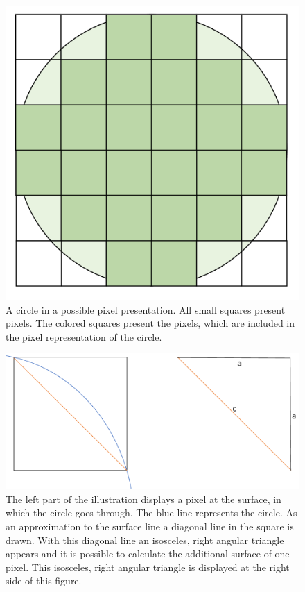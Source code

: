 \begin{figure}[ht]
	\center
	\includegraphics[scale=0.15]{figures/PixelCircleSquare.png}
	\caption[A circle in a possible pixel presentation]{A circle in a possible pixel presentation. All small squares present pixels. The colored squares present the pixels, which are included in the pixel representation of the circle.}
	\label{img:CircleSquarePixels}
\end{figure}

\begin{figure}[ht]
\center
	\includegraphics[scale=0.3]{figures/SurfaceApproximationSQRT2.png}
	\caption[An approximation to the surface of a sphere with a pixel and a diagonal]{The left part of the illustration displays a pixel at the surface, in which the circle goes through. The blue line represents the circle. As an approximation to the surface line a diagonal line in the square is drawn. With this diagonal line an isosceles, right angular triangle appears and it is possible to calculate the additional surface of one pixel. This isosceles, right angular triangle is displayed at the right side of this figure.}
	\label{img:ApproximationSQRT2}
\end{figure}


